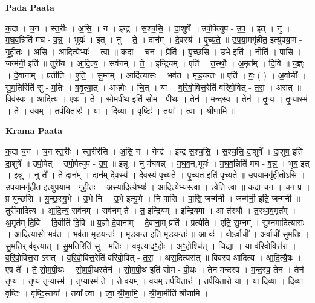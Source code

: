 \documentclass[17pt]{extarticle}
\begin{document}
\textbf{Pada Paata} \newline

क॒दा । च॒न । स्त॒रीः । अ॒सि॒ । न । इ॒न्द्र॒ । स॒श्च॒सि॒ । दा॒शुषे᳚ ॥ उपो॒पेत्युप॑ - उ॒प॒ । इत् । नु । म॒घ॒व॒न्निति॑ मघ - व॒न्न्॒ । भूयः॑ । इत् । नु । ते॒ । दान᳚म् । दे॒वस्य॑ । पृ॒च्य॒ते॒ ॥ उ॒प॒या॒मगृ॑हीत॒ इत्यु॑पया॒म - गृ॒ही॒तः॒ । अ॒सि॒ । आ॒दि॒त्येभ्यः॑ । त्वा॒ ॥ क॒दा । च॒न । प्रेति॑ । यु॒च्छ॒सि॒ । उ॒भे इति॑ । नीति॑ । पा॒सि॒ । जन्म॑नी॒ इति॑ ॥ तुरी॑य । आ॒दि॒त्य॒ । सव॑नम् । ते॒ । इ॒न्द्रि॒यम् । एति॑ । त॒स्थौ॒ । अ॒मृत᳚म् । दि॒वि ॥ य॒ज्ञ्ः । दे॒वाना᳚म् । प्रतीति॑ । ए॒ति॒ । सु॒म्नम् । आदि॑त्यासः । भव॑त । मृ॒ड॒यन्तः॑ ॥ एति॑ । वः॒ ( ) । अ॒र्वाची᳚ । सु॒म॒तिरिति॑ सु - म॒तिः । व॒वृ॒त्या॒त् । अꣳ॒॒होः । चि॒त् । या । व॒रि॒वो॒वित्त॒रेति॑ वरिवो॒वित् - त॒रा॒ । अस॑त् ॥ विव॑स्वः । आ॒दि॒त्य॒ । ए॒षः । ते॒ । सो॒म॒पी॒थ इति॑ सोम - पी॒थः । तेन॑ । म॒न्द॒स्व॒ । तेन॑ । तृ॒प्य॒ । तृ॒प्यास्म॑ । ते॒ । व॒यम् । त॒र्प॒यि॒तारः॑ । या । दि॒व्या । वृष्टिः॑ । तया᳚ । त्वा॒ । श्री॒णा॒मि॒ ॥  \newline


\textbf{Krama Paata} \newline

क॒दा च॒न । च॒न स्त॒रीः । स्त॒रीर॑सि । अ॒सि॒ न । नेन्द्र॑ । इ॒न्द्र॒ स॒श्च॒सि॒ । स॒श्च॒सि॒ दा॒शुषे᳚ । दा॒शुष॒ इति॑ दा॒शुषे᳚ ॥ उपो॒पेत् । उपो॒पेत्युप॑ - उ॒प॒ ॥ इन्नु । नु म॑घवन्न् । म॒घ॒व॒न्,भूयः॑ । म॒घ॒व॒न्निति॑ मघ - व॒न्न्॒ । भूय॒ इत् । इन्नु । नु ते᳚ । ते॒ दान᳚म् । दान॑म् दे॒वस्य॑ । दे॒वस्य॑ पृच्यते । पृ॒च्य॒त॒ इति॑ पृच्यते ॥ उ॒प॒या॒मगृ॑हीतोऽसि । उ॒प॒या॒मगृ॑हीत॒ इत्यु॑पया॒म - गृ॒ही॒तः॒ । अ॒स्या॒दि॒त्येभ्यः॑ । आ॒दि॒त्येभ्य॑स्त्वा । त्वेति॑ त्वा ॥ क॒दा च॒न । च॒न प्र । प्र यु॑च्छसि । यु॒च्छ॒स्यु॒भे । उ॒भे नि । उ॒भे इत्यु॒भे । नि पा॑सि । पा॒सि॒ जन्म॑नी । जन्म॑नी॒ इति॒ जन्म॑नी ॥ तुरी॑यादित्य । आ॒दि॒त्य॒ सव॑नम् । सव॑नम् ते । त॒ इ॒न्द्रि॒यम् । इ॒न्द्रि॒यमा । आ त॑स्थौ । त॒स्था॒व॒मृत᳚म् । अ॒मृत॑म् दि॒वि । दि॒वीति॑ दि॒वि ॥ य॒ज्ञो दे॒वाना᳚म् । दे॒वाना॒म् प्रति॑ । प्रत्ये॑ति । ए॒ति॒ सु॒म्नम् । सु॒म्नमादि॑त्यासः । आदि॑त्यासो॒ भव॑त । भव॑ता मृड॒यन्तः॑ । मृ॒ड॒यन्त॒ इति॑ मृड॒यन्तः॑ ॥ आ वः॑ । वो॒ऽर्वाची᳚ । अ॒र्वाची॑ सुम॒तिः । सु॒म॒तिर् व॑वृत्यात् । सु॒म॒तिरिति॑ सु - म॒तिः । व॒वृ॒त्या॒दꣳ॒॒होः । अꣳ॒॒होश्चि॑त् । चि॒द्या । या व॑रिवो॒वित्त॑रा । व॒रि॒वो॒वित्त॒रा ऽस॑त् । व॒रि॒वो॒वित्त॒रेति॑ वरिवो॒वित् - त॒रा॒ । अस॒दित्यस॑त् ॥ विव॑स्व आदित्य । आ॒दि॒त्यै॒षः । ए॒ष ते᳚ । ते॒ सो॒म॒पी॒थः । सो॒म॒पी॒थस्तेन॑ । सो॒म॒पी॒थ इति॑ सोम - पी॒थः । तेन॑ मन्दस्व । म॒न्द॒स्व॒ तेन॑ । तेन॑ तृप्य । तृ॒प्य॒ तृ॒प्यास्म॑ । तृ॒प्यास्म॑ ते । ते॒ व॒यम् । व॒यम् त॑र्पयि॒तारः॑ । त॒र्प॒यि॒तारो॒ या । या दि॒व्या । दि॒व्या वृष्टिः॑ । वृष्टि॒स्तया᳚ । तया᳚ त्वा । त्वा॒ श्री॒णा॒मि॒ । श्री॒णा॒मीति॑ श्रीणामि । \newline
\end{document}
